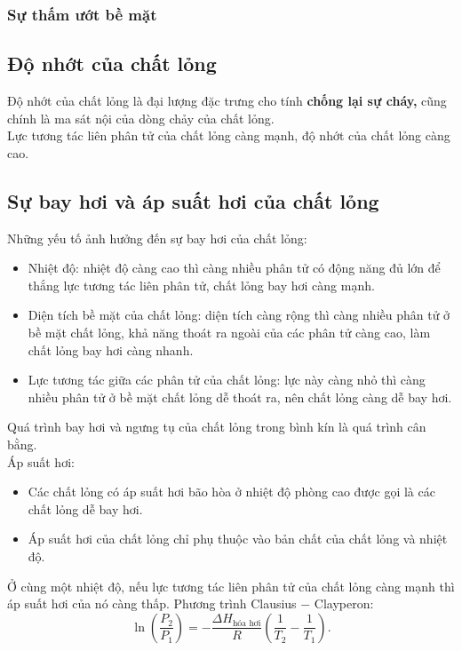 \subsubsection{Sự thấm ướt bề mặt}
\subsection{Độ nhớt của chất lỏng}
Độ nhớt của chất lỏng là đại lượng đặc trưng cho tính \textbf{chống lại sự cháy,} cũng chính là ma sát nội của dòng chảy của chất lỏng.\\
Lực tương tác liên phân tử của chất lỏng càng mạnh, độ nhớt của chất lỏng càng cao.
\subsection{Sự bay hơi và áp suất hơi của chất lỏng}
Những yếu tố ảnh hưởng đến sự bay hơi của chất lỏng:
\begin{itemize}
\item Nhiệt độ: nhiệt độ càng cao thì càng nhiều phân tử có động năng đủ lớn để thắng lực tương tác liên phân tử, chất lỏng bay hơi càng mạnh.
\item Diện tích bề mặt của chất lỏng: diện tích càng rộng thì càng nhiều phân tử ở bề mặt chất lỏng, khả năng thoát ra ngoài của các phân tử càng cao, làm chất lỏng bay hơi càng nhanh.
\item Lực tương tác giữa các phân tử của chất lỏng: lực này càng nhỏ thì càng nhiều phân tử ở bề mặt chất lỏng dễ thoát ra, nên chất lỏng càng dễ bay hơi.
\end{itemize}
Quá trình bay hơi và ngưng tụ của chất lỏng trong bình kín là quá trình cân bằng.\\
Áp suất hơi:
\begin{itemize}
\item Các chất lỏng có áp suất hơi bão hòa ở nhiệt độ phòng cao được gọi là các chất lỏng dễ bay hơi.
\item Áp suất hơi của chất lỏng chỉ phụ thuộc vào bản chất của chất lỏng và nhiệt độ.
\end{itemize}
Ở cùng một nhiệt độ, nếu lực tương tác liên phân tử của chất lỏng càng mạnh thì áp suất hơi của nó càng thấp.
Phương trình Clausius $-$ Clayperon:
$$\ln \left( {\frac{P_2}{P_1}} \right) = - \frac{\Delta H_{\text{hóa hơi}}}{R} \left( {\frac{1}{T_2} - \frac{1}{T_1}} \right).$$
